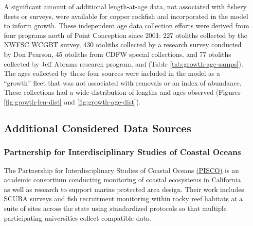 \documentclass[11pt,
  letterpaper,
]{article}
\begin{document}
A significant amount of additional length-at-age data, not associated with fishery fleets or surveys, were available for copper rockfish and incorporated in the model to inform growth. These independent age data collection efforts were derived from four programs north of Point Conception since 2001: 227 otoliths collected by the NWFSC WCGBT survey, 430 otoliths collected by a research survey conducted by Don Pearson, 45 otoliths from CDFW special collections, and 77 otoliths collected by Jeff Abrams research program, and (Table \ref{tab:growth-age-samps}). The ages collected by these four sources were included in the model as a ``growth'' fleet that was not associated with removals or an index of abundance. These collections had a wide distribution of lengths and ages observed (Figures \ref{fig:growth-len-dist} and \ref{fig:growth-age-dist}).

\subsection{Additional Considered Data Sources}\label{additional-considered-data-sources}

\subsubsection{Partnership for Interdisciplinary Studies of Coastal Oceans}\label{partnership-for-interdisciplinary-studies-of-coastal-oceans}

The Partnership for Interdisciplinary Studies of Coastal Oceans \href{https://www.piscoweb.org/}{(PISCO)} is an academic consortium conducting monitoring of coastal ecosystems in California as well as research to support marine protected area design. Their work includes SCUBA surveys and fish recruitment monitoring within rocky reef habitats at a suite of sites across the state using standardized protocols so that multiple participating universities collect compatible data.
\end{document}
